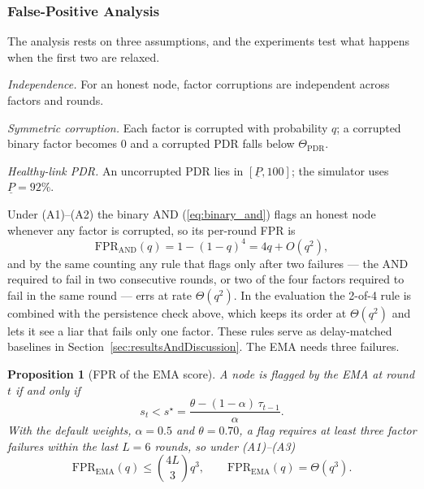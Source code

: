 \documentclass[lineno,pdflatex,sn-nature]{sn-jnl}
\theoremstyle{thmstyleone}%
\newtheorem{proposition}{Proposition}%
\theoremstyle{thmstylethree}%
\begin{document}
\subsubsection{False-Positive Analysis}
The analysis rests on three assumptions, and the experiments test what
happens when the first two are relaxed.
\begin{list}{}{\setlength{\leftmargin}{3.4em}\setlength{\labelwidth}{3.0em}\setlength{\labelsep}{0.4em}\setlength{\itemsep}{1pt}\setlength{\parsep}{0pt}}
\item[(A1)] \emph{Independence.}  For an honest node, factor
corruptions are independent across factors and rounds.
\item[(A2)] \emph{Symmetric corruption.}  Each factor is corrupted
with probability $q$; a corrupted binary factor becomes $0$ and a
corrupted PDR falls below $\Theta_{\mathrm{PDR}}$.
\item[(A3)] \emph{Healthy-link PDR.}  An uncorrupted PDR lies in
$[\underline{P},100]$; the simulator uses $\underline{P}=92\%$.
\end{list}
Under (A1)--(A2) the binary AND (\ref{eq:binary_and}) flags an honest
node whenever any factor is corrupted, so its per-round FPR is
\begin{equation}
\mathrm{FPR}_{\mathrm{AND}}(q) = 1-(1-q)^{4} = 4q + O(q^{2}),
\label{eq:fpr_and}
\end{equation}
and by the same counting any rule that flags only after two failures
--- the AND required to fail in two consecutive rounds, or two of the
four factors required to fail in the same round --- errs at rate
$\Theta(q^{2})$.  In the evaluation the 2-of-4 rule is combined with
the persistence check above, which keeps its order at $\Theta(q^{2})$
and lets it see a liar that fails only one factor.  These rules serve as delay-matched baselines in
Section~\ref{sec:resultsAndDiscussion}.  The EMA needs three failures.

\begin{proposition}[FPR of the EMA score]\label{prop:fpr_ema}
A node is flagged by the EMA at round $t$ if and only if
\begin{equation}
s_t < s^{\star}=\frac{\theta-(1-\alpha)\,\tau_{t-1}}{\alpha}.
\label{eq:sstar}
\end{equation}
With the default weights, $\alpha=0.5$ and $\theta=0.70$, a flag
requires at least three factor failures within the last $L=6$ rounds,
so under (A1)--(A3)
\begin{equation}
\mathrm{FPR}_{\mathrm{EMA}}(q) \le \binom{4L}{3}q^{3},\qquad
\mathrm{FPR}_{\mathrm{EMA}}(q)=\Theta(q^{3}).
\end{equation}
\end{proposition}
\end{document}
